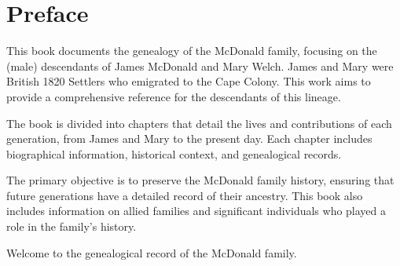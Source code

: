 \chapter{Preface}
\label{preface}

This book documents the genealogy of the McDonald family, focusing on the (male) descendants of James McDonald and Mary Welch. James and Mary were British 1820 Settlers who emigrated to the Cape Colony. This work aims to provide a comprehensive reference for the descendants of this lineage.

The book is divided into chapters that detail the lives and contributions of each generation, from James and Mary to the present day. Each chapter includes biographical information, historical context, and genealogical records.

The primary objective is to preserve the McDonald family history, ensuring that future generations have a detailed record of their ancestry. This book also includes information on allied families and significant individuals who played a role in the family's history.

Welcome to the genealogical record of the McDonald family.